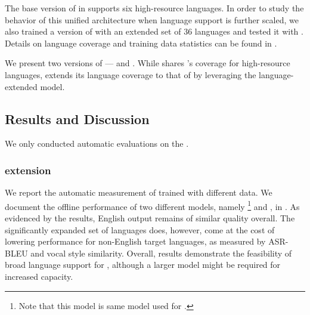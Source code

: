The base version of \ptv in \seamlessexpressive supports six high-resource languages. In order to study the behavior of this unified architecture when language support is further scaled, we also trained a version of \ptv with an extended set of 36 languages and tested it with \seamlessmodel. Details on language coverage and training data statistics can be found in .

We present two versions of \seamlessmodel— and .
While  shares \seamlessexpressive's coverage for high-resource languages, %
 extends its language coverage to that of \seamlessstreaming by leveraging the language-extended \ptv model. %

\subsection{Results and Discussion}
We only conducted automatic evaluations on the \seamlessmodel.
\subsubsection{\ptv extension}
We report the automatic measurement of \ptv trained with different data.
We document the offline performance of two different \ptv models, 
namely \footnote{Note that this model is same \ptv model used for \seamlessexpressive.} and , in . 
As evidenced by the results, English output remains of similar quality overall. The significantly expanded set of languages does, however, come at the cost of lowering performance for non-English target languages, as measured by ASR-BLEU and vocal style similarity. Overall, results demonstrate the feasibility of broad language support for \ptv, although a larger model might be required for increased capacity.

